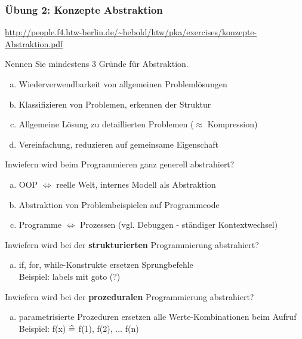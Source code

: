 \begin{card}
	\frametitle{Übung 2: Konzepte Abstraktion}
	\url{http://people.f4.htw-berlin.de/~hebold/htw/pka/exercises/konzepte-Abstraktion.pdf}
\end{card}

\begin{card}
	Nennen Sie mindestens 3 Gründe für Abstraktion.
	\hr
	\begin{enumerate}[a)]
	\item Wiederverwendbarkeit von allgemeinen Problemlösungen
	\item Klassifizieren von Problemen, erkennen der Struktur
	\item Allgemeine Lösung zu detaillierten Problemen ($\approx$ Kompression)
	\item Vereinfachung, reduzieren auf gemeinsame Eigenschaft
	\end{enumerate}
\end{card}

\begin{card}
	Inwiefern wird beim Programmieren ganz generell abstrahiert?
	\hr
	\begin{enumerate}[a)]
	\item OOP $\Leftrightarrow$ reelle Welt, internes Modell als Abstraktion
	\item Abstraktion von Problembeispielen auf Programmcode
	\item Programme $\Leftrightarrow$ Prozessen (vgl. Debuggen - ständiger Kontextwechsel)
	\end{enumerate}
\end{card}

\begin{card}
	Inwiefern wird bei der \textbf{strukturierten} Programmierung abstrahiert?
	\hr
	\begin{enumerate}[a)]
	\item if, for, while-Konstrukte ersetzen Sprungbefehle\\
		Beispiel: labels mit goto (?)
	\end{enumerate}
\end{card}

\begin{card}
	Inwiefern wird bei der \textbf{prozeduralen} Programmierung abstrahiert?
	\hr
	\begin{enumerate}[a)]
	\item parametrisierte Prozeduren ersetzen alle Werte-Kombinationen beim Aufruf\\
		Beispiel: f(x) $\mathrel{\widehat{=}}$ f(1), f(2), ... f(n)
	\end{enumerate}
\end{card}

